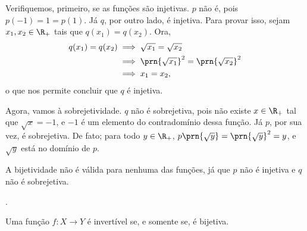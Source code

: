 \begin{solution}
    Verifiquemos, primeiro, se as funções são injetivas. $p$ não é, pois $p(-1)=1=p(1)$.
    Já $q$, por outro lado, é injetiva.
    Para provar isso, sejam $x_1, x_2 \in \R_+$ tais que $q(x_1)=q(x_2)$.
    Ora, 
    \begin{align*}
        q(x_1) = q(x_2) & \implies \sqrt{x_1} = \sqrt{x_2} \\ & \implies \prn{\sqrt{x_1}}^2 = \prn{\sqrt{x_2}}^2 \\ & \implies x_1 = x_2,
    \end{align*}
    o que nos permite concluir que $q$ é injetiva.

    Agora, vamos à sobrejetividade.
    $q$ não é sobrejetiva, pois não existe $x \in \R_+$ tal que $\sqrt x = -1$, e $-1$ é um elemento do contradomínio dessa função.
    Já $p$, por sua vez, é sobrejetiva. 
    De fato; para todo $y \in \R_+$, $p\prn{\sqrt y} = \prn{\sqrt y}^2 = y$, e $\sqrt y$ está no domínio de $p$.

    A bijetividade não é válida para nenhuma das funções, já que $p$ não é injetiva e $q$ não é sobrejetiva.
\end{solution}

\begin{tve}
	.
\end{tve}

\begin{theorem}
\label{theo:inv-sse-bij}
    Uma função $f: X \to Y$ é invertível se, e somente se, é bijetiva.
\end{theorem}

